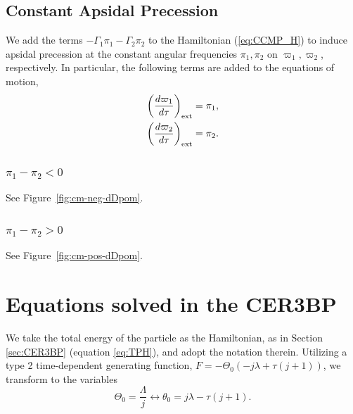 \documentclass[usenatbib,twocolumn]{mnras}
\begin{document}
\subsection{Constant Apsidal Precession}
We add the terms $-\Gamma_1\pi_1-\Gamma_2\pi_2$ to the Hamiltonian (\ref{eq:CCMP_H}) to induce apsidal precession at the constant angular frequencies $\pi_1,\pi_2$ on $\varpi_1,\varpi_2$, respectively. In particular, the following terms are added to the equations of motion,
\begin{align}
    \left(\frac{d\varpi_1 }{d\tau}\right)_{\rm ext} = \pi_1, \\
    \left(\frac{d\varpi_2 }{d\tau}\right)_{\rm ext} = \pi_2.
\end{align}

\subsubsection{$\pi_1-\pi_2<0$}
See Figure~\ref{fig:cm-neg-dDpom}.

\subsubsection{$\pi_1-\pi_2>0$}
See Figure~\ref{fig:cm-pos-dDpom}.








\clearpage


\clearpage
\onecolumn
\appendix
\section{Equations solved in the CER3BP}
We take the total energy of the particle as the Hamiltonian, as in Section \ref{sec:CER3BP} (equation \ref{eq:TPH}), and adopt the notation therein.
Utilizing a type 2 time-dependent generating function, $F=- \Theta_{0} \left(- j \lambda + \tau \left(j + 1\right)\right)$, we transform to the variables
\begin{equation}
    \Theta_{0} = \frac{\Lambda}{j} \longleftrightarrow
    \theta_0 = j \lambda - \tau \left(j + 1\right).
\end{equation}
\end{document}
